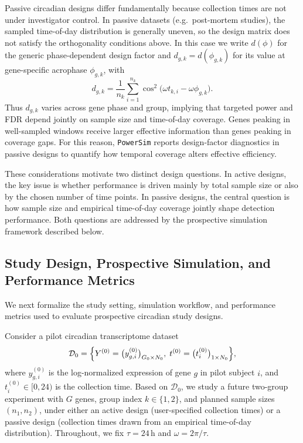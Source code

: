 \documentclass{article}
\newcommand{\software}[1]{\texttt{#1}}
\begin{document}
Passive circadian designs differ fundamentally because collection times are not
under investigator control. In passive datasets (e.g.\ post-mortem studies),
the sampled time-of-day distribution is generally uneven, so the design matrix
does not satisfy the orthogonality conditions above. In this case we write
$d(\phi)$ for the generic phase-dependent design factor and
$d_{g,k}=d(\phi_{g,k})$ for its value at gene-specific acrophase
$\phi_{g,k}$, with
\begin{equation}
d_{g,k}
=
\frac{1}{n_k}\sum_{i=1}^{n_k}
\cos^2\!\bigl(\omega t_{k,i}-\omega\phi_{g,k}\bigr).
\label{eq:design_factor}
\end{equation}
Thus $d_{g,k}$ varies across gene phase and group, implying that targeted power
and FDR depend jointly on sample size and time-of-day coverage. Genes peaking
in well-sampled windows receive larger effective information than genes peaking
in coverage gaps. For this reason, \software{PowerSim} reports design-factor
diagnostics in passive designs to quantify how temporal coverage alters
effective efficiency.

These considerations motivate two distinct design questions. In active designs,
the key issue is whether performance is driven mainly by total sample size or
also by the chosen number of time points. In passive designs, the central
question is how sample size and empirical time-of-day coverage jointly shape
detection performance. Both questions are addressed by the prospective
simulation framework described below.



\subsection{Study Design, Prospective Simulation, and Performance Metrics}
\label{sec:study_design}

We next formalize the study setting, simulation workflow, and performance
metrics used to evaluate prospective circadian study designs.

Consider a pilot circadian transcriptome dataset
\[
\mathcal{D}_0=
\Bigl\{
Y^{(0)}=\bigl(y^{(0)}_{g,i}\bigr)_{G_0\times N_0},
\;
t^{(0)}=\bigl(t_i^{(0)}\bigr)_{1\times N_0}
\Bigr\},
\]
where $y^{(0)}_{g,i}$ is the log-normalized expression of gene $g$ in pilot
subject $i$, and $t_i^{(0)}\in[0,24)$ is the collection time.
Based on $\mathcal{D}_0$, we study a future two-group experiment with $G$
genes, group index $k\in\{1,2\}$, and planned sample sizes $(n_1,n_2)$,
under either an active design (user-specified collection times) or a passive
design (collection times drawn from an empirical time-of-day distribution).
Throughout, we fix $\tau=24$\,h and $\omega=2\pi/\tau$.
\end{document}
